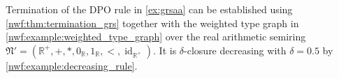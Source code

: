 \begin{example}
    \label{nwf:example:termination}
    Termination of the DPO rule in \autoref{ex:grsaa} can be established using \autoref{nwf:thm:termination_grs} together with the weighted type graph in \autoref{nwf:example:weighted_type_graph} over the real arithmetic semiring $\mathfrak{N}' = (\mathbb{R}^+,+,*,0_\mathbb{R},1_\mathbb{R},<,\operatorname{id}_{\mathbb{R}^+})$. It is $\delta$-closure decreasing with $\delta = 0.5$ by \autoref{nwf:example:decreasing_rule}.
\end{example}

